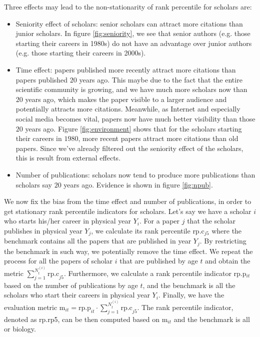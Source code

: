 \begin{refsection}
\iffalse
\clearpage
Three effects may lead to the non-stationarity of rank percentile for scholars are:
\begin{itemize}
  \item Seniority effect of scholars: senior scholars can attract more citations than junior scholars. In figure \ref{fig:seniority}, we see that senior authors (e.g. those starting their careers in 1980s) do not have an advantage over junior authors (e.g. those starting their careers in 2000s). 
  \item Time effect: papers published more recently attract more citations than papers published $20$ years ago. This maybe due to the fact that the entire scientific community is growing, and we have much more scholars now than $20$ years ago, which makes the paper visible to a larger audience and potentially attracts more citations. Meanwhile, as Internet and especially social media becomes vital, papers now have much better visibility than those $20$ years ago. Figure \ref{fig:environment} shows that for the scholars starting their careers in $1980$, more recent papers attract more citations than old papers. Since we've already filtered out the seniority effect of the scholars, this is result from external effects. 
  \item Number of publications: scholars now tend to produce more publications than scholars say $20$ years ago. Evidence is shown in figure \ref{fig:npub}. 
\end{itemize}
We now fix the bias from the time effect and number of publications, in order to get stationary rank percentile indicators for scholars. Let's say we have a scholar $i$ who starts his/her career in physical year $Y_i$. For a paper $j$ that the scholar publishes in physical year $Y_j$, we calculate its rank percentile rp.c$_{j5}$ where the benchmark contains all the papers that are published in year $Y_j$. By restricting the benchmark in such way, we potentially remove the time effect. We repeat the process for all the papers of scholar $i$ that are published by age $t$ and obtain the metric $\sum_{j=1}^{N_t^{(i)}} \text{rp.c}_{j5}$. Furthermore, we calculate a rank percentile indicator rp.p$_{it}$ based on the number of publications by age $t$, and the benchmark is all the scholars who start their careers in physical year $Y_i$. Finally, we have the evaluation metric m$_{it} = \text{rp.p}_{it} \cdot \sum_{j=1}^{N_t^{(i)}} \text{rp.c}_{j5}$. The rank percentile indicator, denoted as rp.rp5, can be then computed based on m$_{it}$ and the benchmark is all or biology. 


\end{refsection}

